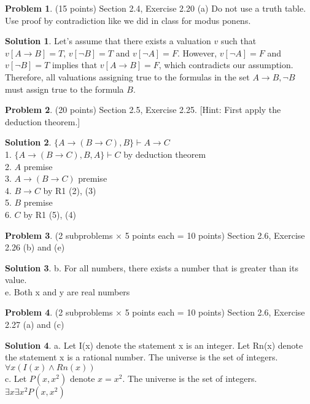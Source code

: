 \documentclass{article}
\theoremstyle{definition}
\newtheorem{problem}{Problem}
\newtheorem*{solution}{Solution}
\begin{document}
\begin{problem} (15 points) Section 2.4, Exercise 2.20 (a)
Do not use a truth table.  Use proof by contradiction like we did in class for modus ponens.
\end{problem}
\begin{solution} 
Let's assume that there exists a valuation $v$ such that $v[A \to B] = T$, $v[\lnot B] = T$ and $v[\lnot A] = F$. However, $v[\lnot A] = F$ and $v[\lnot B] = T$ implies that $v[A \to B] = F$, which contradicts our assumption. Therefore, all valuations assigning true to the formulas in the set ${A \to B, \lnot B}$ must assign true to the formula $B$.
\end{solution}

\begin{problem} (20 points) Section 2.5, Exercise 2.25.
[Hint: First apply the deduction theorem.]
\end{problem}
\begin{solution} 
$\{ A \to (B \to C), B \} \vdash A \to C$\\
1. $ \{ A \to (B \to C), B, A \} \vdash C$ by deduction theorem\\
2. $A$                  premise\\
3. $A \to (B \to C)$    premise\\
4. $B \to C$            by R1 (2), (3)\\
5. $B$                  premise\\
6. $C$                  by R1 (5), (4)
\end{solution}

\begin{problem} (2 subproblems $\times$ 5 points each = 10 points) Section 2.6,
Exercise 2.26 (b) and (e)
\end{problem}
\begin{solution} 
b. For all numbers, there exists a number that is greater than its value.\\
e. Both x and y are real numbers
\end{solution}

\begin{problem} (2 subproblems $\times$ 5 points each = 10 points) Section 2.6,
Exercise 2.27 (a) and (c)
\end{problem}
\begin{solution} 
a. Let I(x) denote the statement x is an integer. Let Rn(x) denote the statement x is a rational number. The universe is the set of integers.\\
$\forall x(I(x) \land Rn(x))$\\
c. Let $P(x,x^2)$ denote $x = x^2$. The universe is the set of integers. $\exists x \exists x^2P(x, x^2)$
\end{solution}
\end{document}
